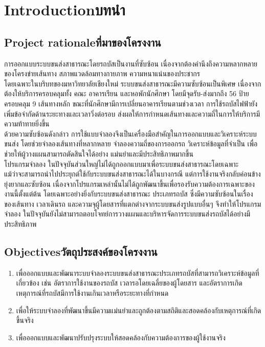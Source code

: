 \chapter{\ifenglish Introduction\else บทนำ\fi}

\setlength{\parindent}{2em}

\section{\ifenglish Project rationale\else ที่มาของโครงงาน\fi}
\begin{mypara}
    \indent การออกแบบระบบขนส่งสาธารณะโดยรถบัสเป็นงานที่ซับซ้อน เนื่องจากต้องคำนึงถึงความหลากหลายของโครงข่ายเส้นทาง 
    สภาพแวดล้อมทางกายภาพ ความหนาแน่นของประชากร \\ 
    \indent โดยเฉพาะในบริบทของมหาวิทยาลัยเชียงใหม่ ระบบขนส่งสาธารณะมีความซับซ้อนเป็นพิเศษ 
    เนื่องจากต้องให้บริการครอบคลุมทั้ง คณะ อาคารเรียน และหอพักนักศึกษา โดยมีจุดรับ-ส่งมากถึง 56 ป้าย ครอบคลุม 9 เส้นทางหลัก 
    ขณะที่นักศึกษามีการเปลี่ยนอาคารเรียนตามช่วงเวลา การใช้รถบัสไฟฟ้ายังเพิ่มข้อจำกัดด้านระยะทางและเวลาวิ่งต่อรอบ 
    ส่งผลให้การกำหนดเส้นทางและความถี่ในการให้บริการมีความท้าทายยิ่งขึ้น \\
    \indent ด้วยความซับซ้อนดังกล่าว การใช้แบบจำลองจึงเป็นเครื่องมือสำคัญในการออกแบบและวิเคราะห์ระบบขนส่ง 
    โดยช่วยจำลองเส้นทางที่หลากหลาย จำลองความถี่ของการออกรถ วิเคราะห์ข้อมูลที่จำเป็น เพื่อช่วยให้ผู้วางแผนสามารถตัดสินใจได้อย่าง
    แม่นยำและมีประสิทธิภาพมากขึ้น  \\
    \indent โปรแกรมจำลอง ในปัจจุบันส่วนใหญ่ไม่ได้ถูกออกแบบมาเพื่อระบบขนส่งสาธารณะโดยเฉพาะ \\
    แม้ว่าจะสามารถนำไปประยุกต์ใช้กับระบบขนส่งสาธารณะได้ในบางกรณี แต่การใช้งานจริงกลับค่อนข้างยุ่งยากและซับซ้อน 
    เนื่องจากโปรแกรมเหล่านั้นไม่ได้ถูกพัฒนาขึ้นเพื่อรองรับความต้องการเฉพาะของงานนี้ตั้งแต่ต้น โดยเฉพาะอย่างยิ่งกับระบบขนส่งสาธารณะ
    ประเภทรถบัส ซึ่งมีความซับซ้อนในเรื่องของเส้นทาง เวลาเดินรถ และความจุผู้โดยสารที่แตกต่างจากระบบขนส่งรูปแบบอื่นๆ 
    จึงทำให้โปรแกรมจำลอง ในปัจจุบันยังไม่สามารถตอบโจทย์การวางแผนและบริหารจัดการระบบขนส่งรถบัสได้อย่างมีประสิทธิภาพ
\end{mypara}

\section{\ifenglish Objectives\else วัตถุประสงค์ของโครงงาน\fi}
\begin{enumerate}
    \item เพื่อออกแบบและพัฒนาระบบจำลองระบบขนส่งสาธารณะประเภทรถบัสที่สามารถวิเคราะห์ข้อมูลที่เกี่ยวข้อง เช่น อัตราการใช้งานของรถบัส เวลารอโดยเฉลี่ยของผู้โดยสาร และอัตราการเกิดเหตุการณ์ที่รถบัสมีการใช้งานเกินเวลาหรือระยะทางที่กำหนด
    \item เพื่อให้ระบบจำลองที่พัฒนาขึ้นมีความแม่นยำและถูกต้องตามสถิติและสอดคล้องกับเหตุการณ์ที่เกิดขึ้นจริง 
    \item เพื่อออกแบบและพัฒนาปรับปรุงระบบให้สอดคล้องกับความต้องการของผู้ใช้งานจริง
\end{enumerate}

